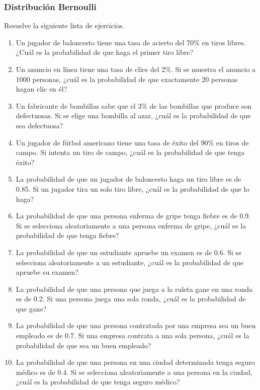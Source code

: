 \subsubsection{Distribución Bernoulli}

\begin{Ejer} Resuelve la siguiente lista de ejercicios.

\begin{enumerate}
    \item Un jugador de baloncesto tiene una tasa de acierto del 70\% en tiros libres. ¿Cuál es la probabilidad de que haga el primer tiro libre?
    \item Un anuncio en línea tiene una tasa de clics del 2\%. Si se muestra el anuncio a 1000 personas, ¿cuál es la probabilidad de que exactamente 20 personas hagan clic en él?
    \item Un fabricante de bombillas sabe que el 3\% de las bombillas que produce son defectuosas. Si se elige una bombilla al azar, ¿cuál es la probabilidad de que sea defectuosa?
    \item Un jugador de fútbol americano tiene una tasa de éxito del 90\% en tiros de campo. Si intenta un tiro de campo, ¿cuál es la probabilidad de que tenga éxito?
    \item La probabilidad de que un jugador de baloncesto haga un tiro libre es de 0.85. Si un jugador tira un solo tiro libre, ¿cuál es la probabilidad de que lo haga?
    \item La probabilidad de que una persona enferma de gripe tenga fiebre es de 0.9. Si se selecciona aleatoriamente a una persona enferma de gripe, ¿cuál es la probabilidad de que tenga fiebre?
    \item La probabilidad de que un estudiante apruebe un examen es de 0.6. Si se selecciona aleatoriamente a un estudiante, ¿cuál es la probabilidad de que apruebe su examen?
    \item La probabilidad de que una persona que juega a la ruleta gane en una ronda es de 0.2. Si una persona juega una sola ronda, ¿cuál es la probabilidad de que gane?
    \item La probabilidad de que una persona contratada por una empresa sea un buen empleado es de 0.7. Si una empresa contrata a una sola persona, ¿cuál es la probabilidad de que sea un buen empleado?
    \item La probabilidad de que una persona en una ciudad determinada tenga seguro médico es de 0.4. Si se selecciona aleatoriamente a una persona en la ciudad, ¿cuál es la probabilidad de que tenga seguro médico?
\end{enumerate}
\end{Ejer}
